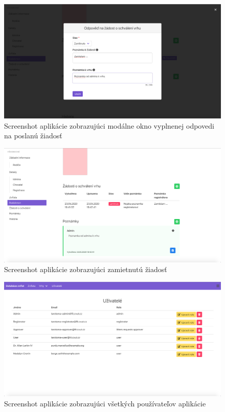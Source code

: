 \begin{figure}[H]
	\includegraphics[width=1.0\textwidth]{media/priloha/vrh/ziadost/4.png}
	\caption{Screenshot aplikácie zobrazujúci modálne okno vyplnenej odpovedi na poslanú žiadosť}
\end{figure}

\begin{figure}[H]
	\includegraphics[width=1.0\textwidth]{media/priloha/vrh/ziadost/5.png}
	\caption{Screenshot aplikácie zobrazujúci zamietnutú žiadosť}
\end{figure}

\begin{figure}[H]
	\includegraphics[width=1.0\textwidth]{media/priloha/pouzivatelia/1.png}
	\caption{Screenshot aplikácie zobrazujúci všetkých používateľov aplikácie}
\end{figure}

